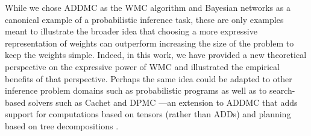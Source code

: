 While we chose \textsf{ADDMC} \citep{DBLP:conf/aaai/DudekPV20} as the WMC
algorithm and Bayesian networks as a canonical example of a probabilistic
inference task, these are only examples meant to illustrate the broader idea
that choosing a more expressive representation of weights can outperform
increasing the size of the problem to keep the weights simple. Indeed, in this
work, we have provided a new theoretical perspective on the expressive power of
WMC and illustrated the empirical benefits of that perspective. Perhaps the same
idea could be adapted to other inference problem domains such as probabilistic
programs
\citep{DBLP:journals/tplp/FierensBRSGTJR15,DBLP:journals/corr/abs-2005-09089} as
well as to search-based solvers such as \textsf{Cachet}
\citep{DBLP:conf/sat/SangBBKP04} and \textsf{DPMC} ---an extension to
\textsf{ADDMC} that adds support for computations based on tensors (rather than
ADDs) and planning based on tree decompositions \cite{DBLP:conf/cp/DudekPV20}.
